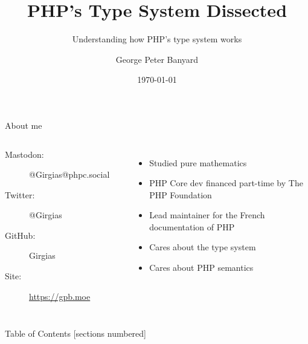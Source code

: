 \documentclass[aspectratio=169]{beamer}
\title{PHP's Type System Dissected}
\subtitle{Understanding how PHP's type system works}
\date{\today}
\author{George Peter Banyard}
\institute{The PHP Foundation}
\begin{document}
\maketitle

\begin{frame}{About me}
    \begin{center}
    \begin{columns}[T]
        \column{0.5\paperwidth}
            \begin{description}
                \item[Mastodon:] @Girgias@phpc.social
                \item[Twitter:] @Girgias
                \item[GitHub:] Girgias
                \item[Site:] \url{https://gpb.moe}
            \end{description}
            \begin{center}
                  
            \end{center}
            
            \begin{itemize}
                \item Studied pure mathematics
                \item PHP Core dev financed part-time by \alert{The PHP Foundation}
                \item Lead maintainer for the French documentation of PHP
                \item Cares about the type system
                    \cite{banyard_pure_2021}
                    \cite{banyard_disjunctive_2022}
                    \cite{banyard_allow_2022}
                    \cite{banyard_add_2022}
                \item Cares about PHP semantics
                    \cite{banyard_saner_2020}
                    \cite{banyard_saner_2023}
                    \cite{banyard_path_2022}
            \end{itemize}
    \end{columns}
    \end{center}
\end{frame}

\begin{frame}{Table of Contents}
  [sections numbered]
  \tableofcontents%
\end{frame}
\end{document}
